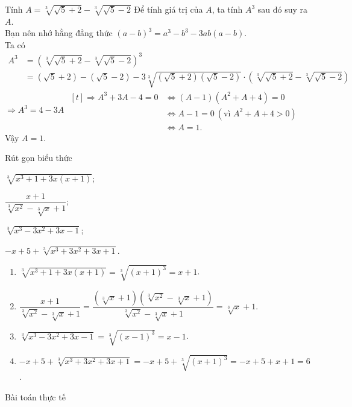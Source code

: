 \begin{vd}%
	Tính $A=\sqrt[3]{\sqrt{5} + 2} - \sqrt[3]{\sqrt{5} - 2}$
	\loigiai
	{
	Để tính giá trị của $A$, ta tính $A^3$ sau đó suy ra $A$.\\ 
	Bạn nên nhớ hằng đẳng thức $(a - b)^3=a^3 - b^3 - 3a b(a - b)$.\\ 
	Ta có
	\begin{align*}
	A^3&=\left(\sqrt[3]{\sqrt{5} + 2} - \sqrt[3]{\sqrt{5} - 2}\right)^3\\
	&=(\sqrt{5} + 2) - (\sqrt{5} - 2) - 3\sqrt[3]{(\sqrt{5} + 2)(\sqrt{5} - 2)}\cdot\left(\sqrt[3]{\sqrt{5} + 2} - \sqrt[3]{\sqrt{5} - 2}\right)
	\end{align*}
	$\Rightarrow A^3=4 - 3A$
	$\begin{aligned}[t]
	\Rightarrow A^3 + 3A - 4=0 &\Leftrightarrow(A - 1)\left(A^2 + A + 4\right)=0\\
	&\Leftrightarrow A - 1=0~\left(\text{vì }A^2 + A + 4>0\right)\\
	&\Leftrightarrow A=1.
	\end{aligned}$\\
	Vậy $A=1$.
	}
\end{vd}
\begin{vd}%
	Rút gọn biểu thức 
	\begin{listEX}[2]
	\item $\sqrt[3]{x^3 + 1 + 3x(x + 1)}$;
	\item $\dfrac{x + 1}{\sqrt[3]{x^2} - \sqrt[3]{x} + 1}$;
	\item $\sqrt[3]{x^3-3x^2+3x-1}$;
	\item $-x+5+\sqrt[3]{x^3+3x^2+3x+1}$.
	\end{listEX}
	\loigiai
	{
	\begin{enumerate}
	\item $\sqrt[3]{x^3 + 1 + 3x(x + 1)}=\sqrt[3]{(x + 1)^3}=x + 1$.
	\item $\dfrac{x + 1}{\sqrt[3]{x^2} - \sqrt[3]{x} + 1}=\dfrac{(\sqrt[3]{x} + 1)\left(\sqrt[3]{x^2} - \sqrt[3]{x} + 1\right)}{\sqrt[3]{x^2} - \sqrt[3]{x} + 1}=\sqrt[3]{x} + 1$.
	\item $\sqrt[3]{x^3-3x^2+3x-1}=\sqrt[3]{(x-1)^3}=x-1$.
	\item $-x+5+\sqrt[3]{x^3+3x^2+3x+1}=-x+5+\sqrt[3]{(x+1)^3}=-x+5+x+1=6$.
	\end{enumerate}
	}
\end{vd}
\begin{dang}{Bài toán thực tế}
\end{dang}
